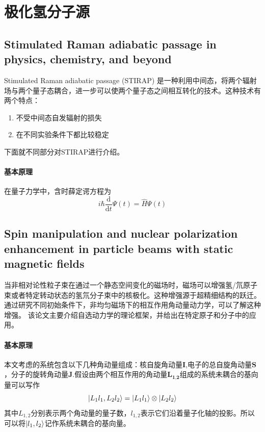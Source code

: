 \documentclass{article}
\numberwithin{equation}{subsection} %
\numberwithin{figure}{subsection} %
\numberwithin{table}{subsection} %
\begin{document}
\newpage
\section{极化氢分子源}

\subsection{Stimulated Raman adiabatic passage in physics,  chemistry, and beyond\cite{vitanov_stimulated_2017}}
Stimulated Raman adiabatic passage (STIRAP) 是一种利用中间态，将两个辐射场与两个量子态耦合，进一步可以使两个量子态之间相互转化的技术。这种技术有两个特点：
\begin{enumerate}
    \item 不受中间态自发辐射的损失
    \item 在不同实验条件下都比较稳定
\end{enumerate} 
下面就不同部分对STIRAP进行介绍。
\paragraph{基本原理}

在量子力学中，含时薛定谔方程为 
\begin{equation}
    i\hbar\frac{\text{d}}{\text{d} t}\Psi(t) = \hat{H}\Psi(t)
\end{equation}  



\subsection{Spin manipulation and nuclear polarization enhancement in particle beams with static magnetic fields\cite{kannis_spin_2025}}

当非相对论性粒子束在通过一个静态空间变化的磁场时，磁场可以增强氢/氘原子束或者特定转动状态的氢氘分子束中的核极化。这种增强源于超精细结构的跃迁。 通过研究不同初始条件下，非均匀磁场下的相互作用角动量动力学，可以了解这种增强。  该论文主要介绍自选动力学的理论框架，并给出在特定原子和分子中的应用。

\paragraph{基本原理}
本文考虑的系统包含以下几种角动量组成：核自旋角动量\(\textbf{I}\),电子的总自旋角动量\(\textbf{S}\)，分子的旋转角动量\(\textbf{J}\).假设由两个相互作用的角动量\(\textbf{L}_{\textbf{1,2}}\)组成的系统未耦合的基向量可以写作
\begin{equation}
    \ket{L_1l_1,L_2l_2} = \ket{L_1l_1}\otimes\ket{L_2l_2}
    \label{eq:uncoupled_basis_vector}   
\end{equation}  
其中\(L_{1,2}\)分别表示两个角动量的量子数，\(l_{1,2}\)表示它们沿着量子化轴的投影。所以可以将\(\ket{l_1,l_2}\)记作系统未耦合的基向量。
\end{document}
